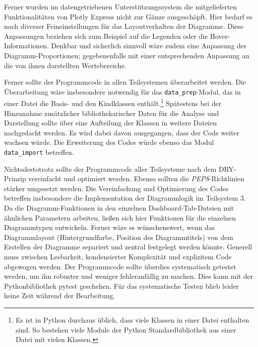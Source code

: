 Ferner wurden im datengetriebenen Unterstützungssystem die mitgelieferten Funktionalitäten von Plotly Express nicht zur Gänze ausgeschöpft.
Hier bedarf es noch diverser Feineinstellungen für das Layoutverhalten der Diagramme.
Diese Anpassungen beziehen sich zum Beispiel auf die Legenden oder die Hover-Informationen.
Denkbar und sicherlich sinnvoll wäre zudem eine Anpassung der Diagramm-Proportionen; gegebenenfalls mit einer entsprechenden Anpassung an die von ihnen darstellten Wertebereiche. 


Ferner sollte der Programmcode in allen Teilsystemen überarbeitet werden. Die Überarbeitung wäre insbesondere notwendig für das \texttt{data\_prep}-Modul, 
das in einer Datei die Basis- und den Kindklassen enthält.\footnote{ Es ist in Python durchaus üblich, dass viele Klassen in einer Datei enthalten sind. 
So bestehen viele Module der Python Standardbibliothek aus einer Datei mit vielen Klassen.}
Spätestens bei der Hinzunahme zusätzlicher bibliothekarischer Daten für die Analyse und Darstellung sollte über eine Aufteilung der Klassen in weitere Dateien nachgedacht werden. 
Es wird dabei davon ausgegangen, dass der Code weiter wachsen würde. Die Erweiterung des Codes würde ebenso das Modul \texttt{data\_import} betreffen. 

Nichtsdestotrotz sollte der Programmcode aller Teilsysteme nach dem \acrfull{DRY}-Prinzip vereinfacht und optimiert werden.
Ebenso sollten die \textit{\acrshort{PEP8}}-Richtlinien stärker umgesetzt werden.
Die Vereinfachung und Optimierung des Codes betreffen insbesondere die Implementation der Diagrammlogik im Teilsystem 3. Da die Diagramm-Funktionen in den einzelnen Dashboard-Tab-Dateien mit ähnlichen Parametern arbeiten, 
ließen sich hier Funktionen für die einzelnen Diagrammtypen entwickeln. Ferner wäre es wünschenswert, wenn das Diagrammlayout (Hintergrundfarbe, Position des Diagrammtitels) 
von dem Erstellen der Diagramme separiert und zentral festgelegt werden könnte. 
Generell muss zwischen Lesbarkeit, kondensierter Komplexität und explizitem Code abgewogen werden. %
Der Programmcode sollte überdies systematisch getestet werden, um ihn robuster und weniger fehleranfällig zu machen. 
Dies kann mit der Pythonbibliothek pytest \cite[vgl.][]{krekel_pytest_2021} geschehen. Für das systematische Testen blieb leider keine Zeit während der Bearbeitung.


